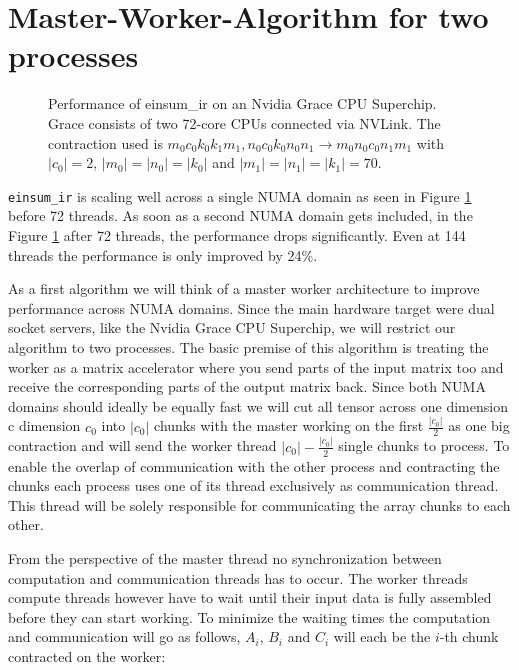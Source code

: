 

\section{Master-Worker-Algorithm for two processes}

\begin{figure}[ht]
  \caption{
    Performance of einsum\_ir on an Nvidia Grace CPU Superchip.
    Grace consists of two 72-core CPUs connected via NVLink.
    The contraction used is $m_0c_0k_0k_1m_1, n_0c_0k_0n_0n_1 \rightarrow m_0n_0c_0n_1m_1$ with $|c_0|=2$, $|m_0|=|n_0|=|k_0|$ and $|m_1|=|n_1|=|k_1|=70$.
  }
  \label{fig:perf_threads}
\end{figure}

\texttt{einsum\_ir} is scaling well across a single NUMA domain as seen in Figure \ref{fig:perf_threads} before 72 threads.
As soon as a second NUMA domain gets included, in the Figure \ref{fig:perf_threads} after 72 threads, the performance drops significantly.
Even at 144 threads the performance is only improved by 24\%.

As a first algorithm we will think of a master worker architecture to improve performance across NUMA domains.
Since the main hardware target were dual socket servers, like the Nvidia Grace CPU Superchip, we will restrict our algorithm to two processes.
The basic premise of this algorithm is treating the worker as a matrix accelerator where you send parts of the input matrix too and receive the corresponding parts of the output matrix back.
Since both NUMA domains should ideally be equally fast we will cut all tensor across one dimension c dimension $c_0$ into $|c_0|$ chunks with the master working on the first $\frac{|c_0|}{2}$ as one big contraction and will send the worker thread $|c_0|-\frac{|c_0|}{2}$ single chunks to process.
To enable the overlap of communication with the other process and contracting the chunks each process uses one of its thread exclusively as communication thread.
This thread will be solely responsible for communicating the array chunks to each other.

From the perspective of the master thread no synchronization between computation and communication threads has to occur.
The worker threads compute threads however have to wait until their input data is fully assembled before they can start working.
To minimize the waiting times the computation and communication will go as follows, $A_i$, $B_i$ and $C_i$ will each be the $i$-th chunk contracted on the worker:

